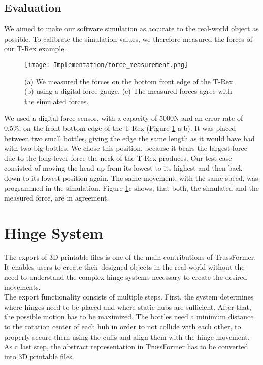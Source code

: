 \subsection{Evaluation}
We aimed to make our software simulation as accurate to the real-world object as possible. To calibrate the simulation values, we therefore measured the forces of our T-Rex example.\\
\begin{figure}[ht!]
    \texttt{[image: Implementation/force\_measurement.png]}
    \centering
    \caption{(a) We measured the forces on the bottom front edge of the T-Rex (b) using a digital force gauge. (c) The measured forces agree with the simulated forces.}
    \label{fig:force_measurement}
\end{figure}
We used a digital force sensor, with a capacity of 5000N and an error rate of 0.5\%, on the front bottom edge of the T-Rex (Figure \ref{fig:force_measurement} a-b). It was placed between two small bottles, giving the edge the same length as it would have had with two big bottles. We chose this position, because it bears the largest force due to the long lever force the neck of the T-Rex produces. Our test case consisted of moving the head up from its lowest to its highest and then back down to its lowest position again. The same movement, with the same speed, was programmed in the simulation. Figure \ref{fig:force_measurement}c shows, that both, the simulated and the measured force, are in agreement.

\section{Hinge System}
The export of 3D printable files is one of the main contributions of TrussFormer. It enables users to create their designed objects in the real world without the need to understand the complex hinge systems necessary to create the desired movements.\\
The export functionality consists of multiple steps. First, the system determines where hinges need to be placed and where static hubs are sufficient. After that, the possible motion has to be maximized. The bottles need a minimum distance to the rotation center of each hub in order to not collide with each other, to properly secure them using the cuffs and align them with the hinge movement. As a last step, the abstract representation in TrussFormer has to be converted into 3D printable files.

